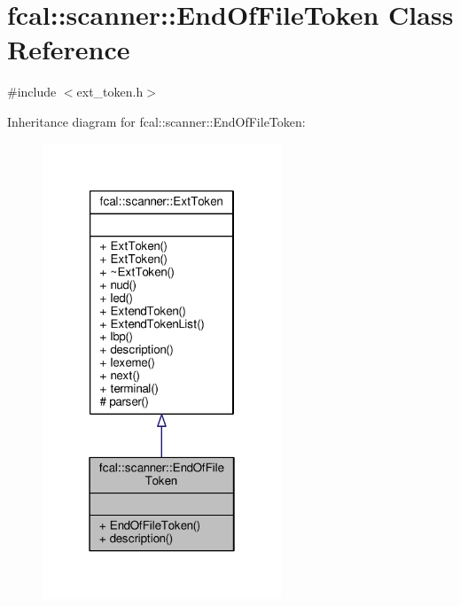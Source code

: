 \hypertarget{classfcal_1_1scanner_1_1EndOfFileToken}{}\section{fcal\+:\+:scanner\+:\+:End\+Of\+File\+Token Class Reference}
\label{classfcal_1_1scanner_1_1EndOfFileToken}


{\ttfamily \#include $<$ext\+\_\+token.\+h$>$}



Inheritance diagram for fcal\+:\+:scanner\+:\+:End\+Of\+File\+Token\+:
\nopagebreak
\begin{figure}[H]
\begin{center}
\leavevmode
\includegraphics[width=202pt]{classfcal_1_1scanner_1_1EndOfFileToken__inherit__graph}
\end{center}
\end{figure}



